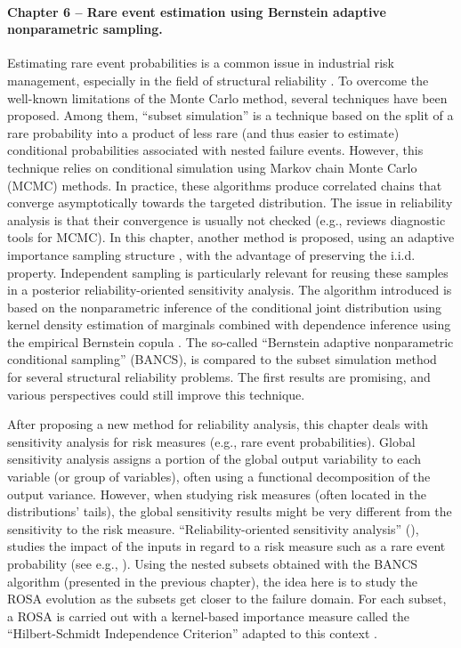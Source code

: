 \paragraph{Chapter 6 -- Rare event estimation using Bernstein adaptive nonparametric sampling.} 
Estimating rare event probabilities is a common issue in industrial risk management, especially in the field of structural reliability \citep{MorioBalesdent2015}. 
To overcome the well-known limitations of the Monte Carlo method, several techniques have been proposed. 
Among them, ``subset simulation'' \citep{AuBeck2001} is a technique based on the split of a rare probability into a product of less rare (and thus easier to estimate) conditional probabilities associated with nested failure events. 
However, this technique relies on conditional simulation using Markov chain Monte Carlo (MCMC) methods. 
In practice, these algorithms produce correlated chains that converge asymptotically towards the targeted distribution. 
The issue in reliability analysis is that their convergence is usually not checked (e.g., \citealp{roy_2020_mcmc_convergence} reviews diagnostic tools for MCMC).    
In this chapter, another method is proposed, using an adaptive importance sampling structure \citep{zhang_1996_NIS}, with the advantage of preserving the i.i.d. property. 
Independent sampling is particularly relevant for reusing these samples in a posterior reliability-oriented sensitivity analysis. 
The algorithm introduced is based on the nonparametric inference of the conditional joint distribution using kernel density estimation of marginals combined with dependence inference using the empirical Bernstein copula \citep{sancetta_satchell_2004}. 
The so-called ``Bernstein adaptive nonparametric conditional sampling'' (BANCS), is compared to the subset simulation method for several structural reliability problems. 
The first results are promising, and various perspectives could still improve this technique.

After proposing a new method for reliability analysis, this chapter deals with sensitivity analysis for risk measures (e.g., rare event probabilities). 
Global sensitivity analysis \citep{daveiga_iooss_2021} assigns a portion of the global output variability to each variable (or group of variables), often using a functional decomposition of the output variance. 
However, when studying risk measures (often located in the distributions' tails), the global sensitivity results might be very different from the sensitivity to the risk measure. 
``Reliability-oriented sensitivity analysis'' (), studies the impact of the inputs in regard to a risk measure such as a rare event probability (see e.g., \citealp{chabridon_2018_thesis}). 
Using the nested subsets obtained with the BANCS algorithm (presented in the previous chapter), the idea here is to study the ROSA evolution as the subsets get closer to the failure domain. 
For each subset, a ROSA is carried out with a kernel-based importance measure called the ``Hilbert-Schmidt Independence Criterion'' adapted to this context \citep{daveiga_2015,marrel_chabridon_2021}. 

